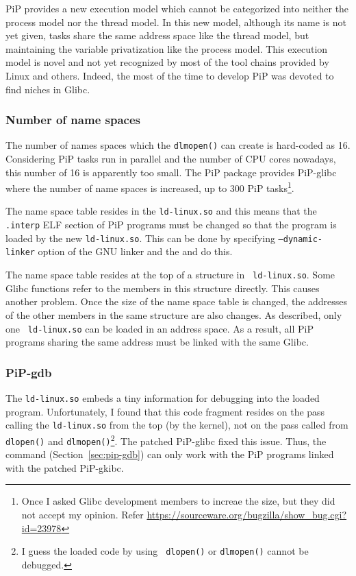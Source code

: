 PiP provides a new execution model which cannot be categorized into
neither the process model nor the thread model. In this new model,
although its name is not yet given, tasks share the same address
space like the thread model, but maintaining the variable
privatization like the process model. This execution
model is novel and not yet recognized by most of the tool chains
provided by Linux and others. Indeed, the most of the time to develop
PiP was devoted to find niches in Glibc.

\subsubsection{Number of name spaces}

The number of names spaces which the {\tt dlmopen()} can create is
hard-coded as 16. Considering PiP tasks run in parallel and the number
of CPU cores nowadays, this number of 16 is apparently too small. The
PiP package provides PiP-glibc where the number of name spaces is
increased, up to 300 PiP tasks\footnote{Once I asked Glibc
development members to increae the size, but they did not accept my
opinion. Refer
\url{https://sourceware.org/bugzilla/show_bug.cgi?id=23978}}.  

The name space table resides in the {\tt ld-linux.so} and this means
that the {\tt .interp} ELF section of PiP programs must be changed so
that the program is loaded by the new {\tt ld-linux.so}. This can be
done by specifying {\tt --dynamic-linker} option of the GNU linker and
the  and  do this.

The name space table resides at the top of a structure in {\tt
  ld-linux.so}. Some Glibc functions refer to the members in this
structure directly. This causes another problem. Once the size of the
name space table is changed, the addresses of the other members in the
same structure are also changes. As described, only one {\tt
  ld-linux.so} can be loaded in an address space. As a result, all PiP 
programs sharing the same address must be linked with the same Glibc. 

\subsubsection{PiP-gdb}

The {\tt ld-linux.so} embeds a tiny information for debugging into the
loaded program. Unfortunately, I found that this code fragment
resides on the pass calling the {\tt ld-linux.so} from the
top (by the kernel), not on the pass called from {\tt dlopen()}
  and {\tt dlmopen()}\footnote{I guess the loaded code by using {\tt
    dlopen()} or {\tt dlmopen()} cannot be debugged.}. The patched
  PiP-glibc fixed this issue. Thus, the  command
  (Section~\ref{sec:pip-gdb}) can only work with 
  the PiP programs linked with the patched PiP-gkibc.

